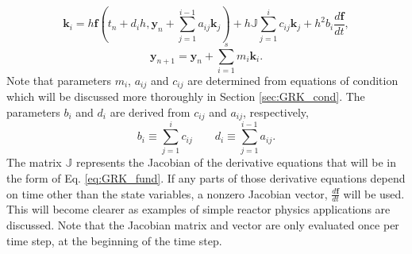 \documentclass{ansconf}
\numberwithin{equation}{section}
\begin{document}
\begin{equation} \label{eq:GRK_nonauto}
    \mathbf{k}_{i} = h\mathbf{f} \left(t_n + d_ih,\mathbf{y}_n + \sum_{j=1}^{i-1}a_{ij}\mathbf{k}_{j}\right) 
                                + h\mathbb{J}\sum_{j=1}^i c_{ij}\mathbf{k}_{j}  + h^2b_i\frac{d\mathbf{f}}{dt},
\end{equation}
\begin{equation}
    \mathbf{y}_{n+1} = \mathbf{y}_{n} + \sum_{i=1}^s m_i\mathbf{k}_i.
\end{equation}
Note that parameters $m_i$, $a_{ij}$ and $c_{ij}$ are determined from equations of condition which will be discussed more thoroughly in Section \ref{sec:GRK_cond}. The parameters $b_i$ and $d_i$ are derived from $c_{ij}$ and $a_{ij}$, respectively,
\begin{equation}
     b_i \equiv \sum_{j=1}^ic_{ij} \qquad d_i \equiv \sum_{j=1}^{i-1}a_{ij}.
\end{equation}
The matrix $\mathbb{J}$ represents the Jacobian of the derivative equations that will be in the form of Eq. \eqref{eq:GRK_fund}. If any parts of those derivative equations depend on time other than the state variables, a nonzero Jacobian vector, $\frac{d\mathbf{f}}{dt}$ will be used. This will become clearer as examples of simple reactor physics applications are discussed. Note that the Jacobian matrix and vector are only evaluated once per time step, at the beginning of the time step.

 \label{sec:GRK_cond}
\end{document}
